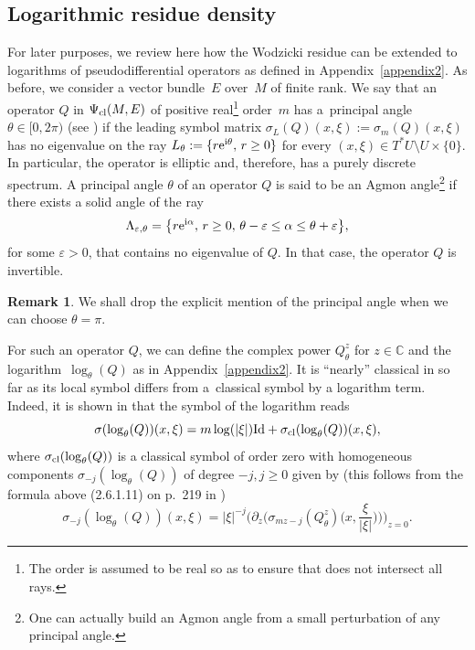 \documentclass[10pt,a4paper]{amsart}
\numberwithin{equation}{section}
\theoremstyle{definition}
\newtheorem{rk}[thm]{Remark}
\newcommand{\C}{\mathbb C}
\begin{document}
\subsection{Logarithmic residue density} \label{sec:logoperator}
For later purposes, we review here how the Wodzicki residue can be extended to logarithms of pseudodifferential operators as defined in Appendix~\ref{appendix2}.
As before, we consider a vector bundle~$E$ over~$M$ of finite rank. We say that an operator $Q$ in $\Psi_{\rm cl}(M, E)$ of positive real\footnote{The order is assumed to be real so as to ensure that does not intersect all rays. } order~$m$ has a~principal angle $\theta\in [0,2\pi)$ (see \cite[Section~1.5.7.1]{Sc}) if the leading symbol matrix $\sigma_L(Q) (x, \xi):=\sigma_m(Q)(x,\xi)$ has no eigenvalue on the ray $L_\theta:= \{ r {\rm e}^{{\rm i}\theta} ,\, r\geq 0\}$ for every $(x, \xi)\in T^*U\setminus U\times \{0\}$.
	 In particular, the operator is elliptic and, therefore, has a purely discrete spectrum. A principal angle $\theta$ of an operator $Q$ is said to be an Agmon angle\footnote{One can actually build an Agmon angle from a small perturbation of any principal angle.} if there exists a solid angle of the ray
\[
\Lambda_{\varepsilon,\theta}=\big\{r{\rm e}^{{\rm i}\alpha},\, r\geq 0, \,\theta-\varepsilon\leq \alpha\leq \theta+\varepsilon\big\},
\]
	 for some $\varepsilon>0$, that contains no eigenvalue of $Q$.
	 In that case, the operator $Q$ is invertible.

\begin{rk} We shall drop the explicit mention of the principal angle when we can choose $\theta=\pi$.\end{rk}
For such an operator $Q$, we can define the complex power $Q_\theta^z$ for $z\in \C$ and the logarithm~$\log_\theta(Q)$ as in Appendix~\ref{appendix2}. It is ``nearly'' classical in so far as its local symbol differs from a~classical symbol by a logarithm term. Indeed, it is shown in \cite[formula~(2.6.1.11)]{Sc} that the symbol of the logarithm reads
\begin{equation}
\label{eq:sigmmalog}
\sigma(\log _\theta (Q))(x,\xi)=m \log (|\xi|){\rm Id} +\sigma_{\rm cl}(\log _\theta (Q))(x,\xi),
\end{equation}
where $\sigma_{\rm cl}(\log _\theta(Q))$ is a classical symbol of order zero with homogeneous components \linebreak $\sigma_{-j}(\log _\theta(Q))$ of degree $-j, j\geq 0$ given by (this follows from the formula above (2.6.1.11) on p.~219 in \cite{Sc})
\begin{equation*}%
\sigma_{-j}(\log _\theta (Q))(x,\xi)=|\xi|^{-j}\biggl(\partial_z\biggl(\sigma_{mz-j}(Q^z_\theta)\biggl(x,\frac{\xi}{|\xi|}\biggr)\biggr)\biggr)_{z=0}.
\end{equation*}
\end{document}
